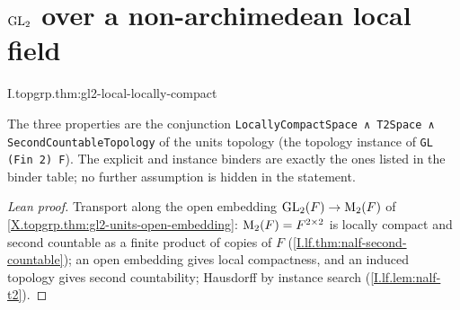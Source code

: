 \section{\texorpdfstring{$\mathrm{GL}_2$ over a non-archimedean local field}{GL₂ over a non-archimedean local field}}
\begin{theorem}
\end{theorem}
\begin{tfformal}{I.topgrp.thm:gl2-local-locally-compact}
\begin{tffidelity}
The three properties are the conjunction \texttt{LocallyCompactSpace ∧ T2Space ∧ SecondCountableTopology} of the units topology (the topology instance of \texttt{GL (Fin 2) F}). The explicit and instance binders are exactly the ones listed in the binder table; no further assumption is hidden in the statement.
\end{tffidelity}
\end{tfformal}
\begin{proof}[Lean proof]
Transport along the open embedding $\mathrm{GL}_2(F)\to\mathrm{M}_2(F)$ of \cref{X.topgrp.thm:gl2-units-open-embedding}: $\mathrm{M}_2(F)=F^{2\times2}$ is locally compact and second countable as a finite product of copies of $F$ (\cref{I.lf.thm:nalf-second-countable}); an open embedding gives local compactness, and an induced topology gives second countability; Hausdorff by instance search (\cref{I.lf.lem:nalf-t2}).
\end{proof}

